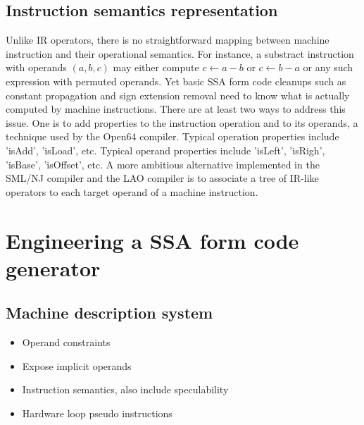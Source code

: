 \subsection{Instruction semantics representation}

Unlike IR operators, there is no straightforward mapping between machine
instruction and their operational semantics. For instance, a substract
instruction with operands $(a,b,c)$ may either compute $c \leftarrow a-b$ or $c
\leftarrow b-a$ or any such expression with permuted operands. Yet basic SSA
form code cleanups such as constant propagation and sign extension removal need
to know what is actually computed by machine instructions. There are at least
two ways to address this issue. One is to add properties to the instruction
operation and to its operands, a technique used by the Open64 compiler. Typical
operation properties include 'isAdd', 'isLoad', etc. Typical operand properties
include 'isLeft', 'isRigh', 'isBase', 'isOffset', etc. A more ambitious
alternative implemented in the SML/NJ \cite{Leung:1999:PLDI} compiler and the
LAO compiler \cite{Dinechin:2000:CASES} is to associate a tree of IR-like
operators to each target operand of a machine instruction.



\section{Engineering a SSA form code generator}
\label{sec:ssa-codegen-engineering}

\subsection{Machine description system}

\begin{itemize}

\item Operand constraints

\item Expose implicit operands

\item Instruction semantics, also include speculability

\item Hardware loop pseudo instructions

\end{itemize}

